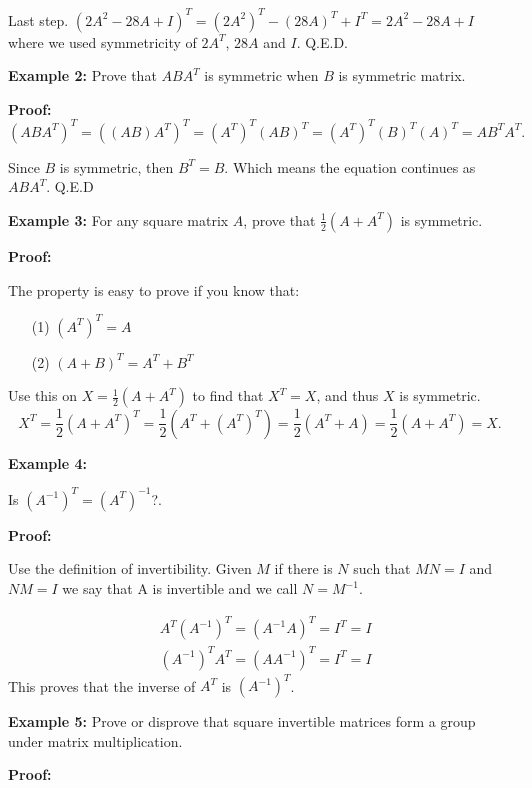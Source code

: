 \documentclass{article}
\begin{document}
Last step. $(2A^2-28A+I)^T=(2A^2)^T-(28A)^T+I^T=2A^2-28A+I$ where we used symmetricity of $2A^T$, $28A$ and $I$. Q.E.D.

\textbf{Example 2:} Prove that $A B A^T$ is symmetric when $B$ is symmetric matrix.

\textbf{Proof:} $$\left(A B A^T\right)^T=\left((A B) A^T\right)^T=(A^T)^T(A B)^T=\left(A^T\right)^T(B)^T(A)^T=A B^T A^T.$$

Since $B$ is symmetric, then $B^T=B$. Which means the equation continues as $A B A^T$. Q.E.D

\textbf{Example 3:} For any square matrix $A$, prove that $\frac{1}{2}\left(A+A^T\right)$ is symmetric.

\textbf{Proof:}

The property is easy to prove if you know that:
\begin{itemize}
\item[(1)]	$\left(A^T\right)^T=A$
\item[(2)]   $(A+B)^T=A^T+B^T$
\end{itemize}

Use this on $X=\frac{1}{2}\left(A+A^T\right)$ to find that $X^T=X$, and thus $X$ is symmetric.
$$
X^T=\frac{1}{2}\left(A+A^T\right)^T=\frac{1}{2}\left(A^T+\left(A^T\right)^T\right)=\frac{1}{2}\left(A^T+A\right)=\frac{1}{2}\left(A+A^T\right)=X.
$$

\textbf{Example 4:}

Is $\left(A^{-1}\right)^T=\left(A^T\right)^{-1}$?.

\textbf{Proof:}

Use the definition of invertibility. Given $M$ if there is $N$ such that $MN=I$ and $NM=I$ we say that $\mathrm{A}$ is invertible and we call $N=M^{-1}$.

$$
\begin{aligned}
& A^T\left(A^{-1}\right)^T=\left(A^{-1} A\right)^T=I^T=I \\
& \left(A^{-1}\right)^T A^T=\left(A A^{-1}\right)^T=I^T=I
\end{aligned}
$$
This proves that the inverse of $A^T$ is $\left(A^{-1}\right)^T$. 

\newpage\textbf{Example 5:} Prove or disprove that square invertible matrices form a group under matrix multiplication. 

\textbf{Proof:}
\end{document}
